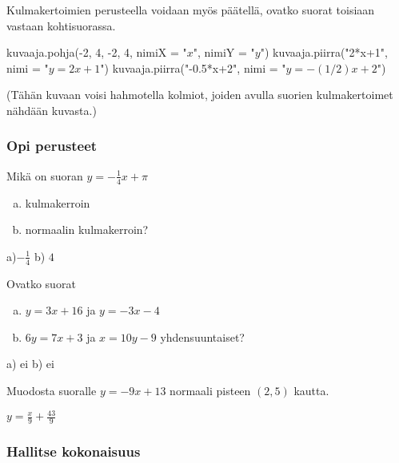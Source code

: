 Kulmakertoimien perusteella voidaan myös päätellä, ovatko suorat toisiaan vastaan kohtisuorassa.

\begin{kuva}
    kuvaaja.pohja(-2, 4, -2, 4, nimiX = "$x$", nimiY = "$y$")
    kuvaaja.piirra("2*x+1", nimi = "$y=2x+1$")
    kuvaaja.piirra("-0.5*x+2", nimi = "$y=-(1/2)x+2$")
\end{kuva}

(Tähän kuvaan voisi hahmotella kolmiot, joiden avulla suorien kulmakertoimet nähdään kuvasta.)



\begin{tehtavasivu}

\subsubsection*{Opi perusteet}

\begin {tehtava}
Mikä on suoran $y=-\frac{1}{4}x+\pi$
\begin{enumerate} [a)]
\item kulmakerroin
\item normaalin kulmakerroin?
\end{enumerate}
\begin {vastaus}
a)$-\frac{1}{4}$  b) $4$ 
\end {vastaus}
\end {tehtava}

\begin {tehtava}
Ovatko suorat 
\begin{enumerate} [a)]
\item $y=3x+16$ ja $y=-3x-4$
\item $6y=7x+3$ ja $x=10y-9$ yhdensuuntaiset?
\end{enumerate}
\begin {vastaus}
a) ei b) ei
\end {vastaus}
\end {tehtava}

\begin {tehtava}
Muodosta suoralle $y=-9x+13$ normaali pisteen $(2,5)$ kautta.
\begin {vastaus}
$y=\frac{x}{9}+\frac{43}{9}$
\end {vastaus}
\end {tehtava}

\subsubsection*{Hallitse kokonaisuus}


\end{tehtavasivu}
